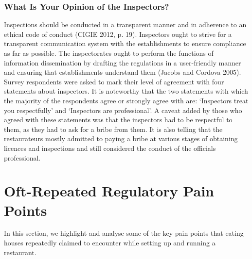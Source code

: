 \documentclass[a4paper, 12pt]{article}
\begin{document}
		\subsubsection {What Is Your Opinion of the Inspectors?}
		Inspections should be conducted in a transparent manner and in adherence to an ethical code of conduct (CIGIE 2012, p. 19). Inspectors ought to strive for a transparent communication system with the establishments to ensure compliance as far as possible. The inspectorates ought to perform the functions of information dissemination by drafting the regulations in a user-friendly manner and ensuring that establishments understand them (Jacobs and Cordova 2005).\\
		Survey respondents were asked to mark their level of agreement with four statements about inspectors. It is noteworthy that the two statements with which the majority of the respondents agree or strongly agree with are: ‘Inspectors treat you respectfully’ and ‘Inspectors are professional’. A caveat added by those who agreed with these statements was that the inspectors had to be respectful to them, as they had to ask for a bribe from them. It is also telling that the restaurateurs mostly admitted to paying a bribe at various stages of obtaining licences and inspections and still considered the conduct of the officials professional.
		





		\section{Oft-Repeated Regulatory Pain Points}
		\label{sec:3}
		
		In this section, we highlight and analyse some of the key pain points that eating houses repeatedly claimed to encounter while setting up and running a restaurant.
		
\end{document}
